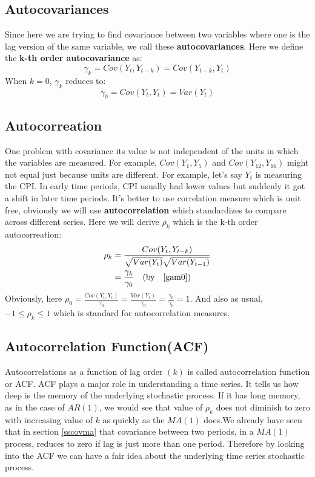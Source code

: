 \documentclass{book}
\begin{document}
\subsection{Autocovariances}	
	Since here we are trying to find covariance between two variables where one is the lag version of the same variable, we call these \textbf{autocovariances}. Here we define the \textbf{k-th order autocovariance} as:
		\begin{equation}
			\gamma_k=Cov(Y_t,Y_{t-k})=Cov(Y_{t-k},Y_t)
			\label{sco2}
		\end{equation}
When $k=0$, $\gamma_k$ reduces to:
		\begin{equation}
			\gamma_0=Cov(Y_t,Y_t)=Var(Y_t)
			\label{gam0}
		\end{equation}

\subsection{Autocorreation}		
	One problem with covariance its value is not independent of the units in which the variables are measured. For example, $Cov(Y_1,Y_5)$  and $Cov(Y_12, Y_16)$ might not equal just because units are different. For example, let's say $Y_t$ is measuring the CPI. In early time periods, CPI usually had lower values but suddenly it got a shift in later time periods. It's better to use correlation measure which is unit free, obviously we will use \textbf{autocorrelation} which standardizes to compare across different series. Here we will derive $\rho_k$ which is the k-th order autocorreation:
		\begin{align}
			\rho_k & =\frac{Cov(Y_t,Y_{t-k})}{\sqrt{Var(Y_t)}\sqrt{Var(Y_{t-1})}} \\
			& =\frac{\gamma_k}{\gamma_0} \quad (\text{by}\quad \eqref{gam0})
			\label{eqrho}
		\end{align}
Obviously, here $\rho_0=\frac{Cov(Y_t,Y_t)}{\gamma_0}=\frac{Var(Y_t)}{\gamma_0}=\frac{\gamma_0}{\gamma_0}=1$. And also as usual, $-1\le \rho_k \le 1 $ which is standard for autocorrelation measures.
		
\subsection{Autocorrelation Function(ACF)} 
Autocorrelations as a function of lag order $(k)$ is called autocorrelation function or ACF. ACF plays a major role in understanding a time series. It tells us how deep is the memory of the underlying stochastic process. If it has long memory, as in the case of $AR(1)$, we would see that value of $\rho_k$ does not diminish to zero with increasing value of $k$ as quickly as the $MA(1)$ does.We already have seen that in section \ref{sscovma} that covariance between two periods, in a $MA(1)$ process, reduces to zero if  lag is just more than one period. Therefore by looking into the ACF we can have a fair idea about the underlying time series stochastic process. 
\end{document}
